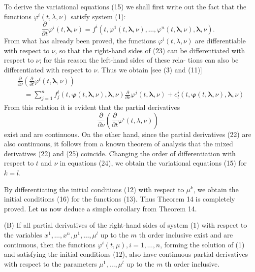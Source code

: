 \documentclass[10pt,a5paper]{book}
\makeatletter
\theoremstyle{plain}
\theoremstyle{definition}
\theoremstyle{remark}
\renewenvironment{proof}[1][\proofname]{\par
  \pushQED{\qed}%
  \normalfont\topsep6\p@\@plus6\p@\relax
  \trivlist
  \item\relax{\itshape #1\@addpunct{.}}\hspace\labelsep\ignorespaces
}{\popQED\endtrivlist\@endpefalse}
\makeatother
\begin{document}
\begin{proof}
To derive the variational equations (15) we shall first write out the fact that the functions $\varphi^{i}(t, \lambda, \nu)$ satisfy system (1):
\begin{equation*}
\frac{\partial}{\partial t} \varphi^{i}(t, \mathbf{\lambda}, \nu)=f^{i}\left(t, \varphi^{1}(t, \boldsymbol{\lambda}, \nu), \ldots, \varphi^{n}(t, \boldsymbol{\lambda}, \nu), \boldsymbol{\lambda}, \nu\right) . \tag{23}
\end{equation*}
From what has already been proved, the functions $\varphi^{i}(t, \lambda, \nu)$ are differentiable with respect to $\nu$, so that the right-hand sides of (23) can be differentiated with respect to $\nu$; for this reason the left-hand sides of these rela-
tions can also be differentiated with respect to $\nu$. Thus we obtain [see (3) and (11)]
\begin{align*}
& \frac{\partial}{\partial \nu}\left(\frac{\partial}{\partial t} \varphi^{i}(t, \boldsymbol{\lambda}, \nu)\right) \\
& \quad=\sum_{j=1}^{n} f_{j}^{i}(t, \boldsymbol{\varphi}(t, \boldsymbol{\lambda}, \nu), \boldsymbol{\lambda}, \nu) \frac{\partial}{\partial \nu} \varphi^{j}(t, \boldsymbol{\lambda}, \nu)+e_{l}^{i}(t, \boldsymbol{\varphi}(t, \boldsymbol{\lambda}, \nu), \boldsymbol{\lambda}, \nu) \tag{24}
\end{align*}
From this relation it is evident that the partial derivatives
\begin{equation*}
\frac{\partial}{\partial \nu}\left(\frac{\partial}{\partial t} \varphi^{i}(t, \lambda, \nu)\right) \tag{25}
\end{equation*}
exist and are continuous. On the other hand, since the partial derivatives (22) are also continuous, it follows from a known theorem of analysis that the mixed derivatives (22) and (25) coincide. Changing the order of differentiation with respect to $t$ and $\nu$ in equations (24), we obtain the variational equations (15) for $k=l$.

By differentiating the initial conditions (12) with respect to $\mu^{k}$, we obtain the initial conditions (16) for the functions (13). Thus Theorem 14 is completely proved. Let us now deduce a simple corollary from Theorem 14.

(B) If all partial derivatives of the right-hand sides of system (1) with respect to the variables $x^{1}, \ldots, x^{n}, \mu^{1}, \ldots, \mu^{l}$ up to the $m$ th order inclusive exist and are continuous, then the functions $\varphi^{i}(t, \mu), i=1, \ldots, n$, forming the solution of (1) and satisfying the initial conditions (12), also have continuous partial derivatives with respect to the parameters $\mu^{1}, \ldots, \mu^{l}$ up to the $m$ th order inclusive.


\end{proof}
\end{document}
